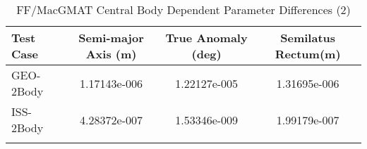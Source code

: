 \begin{table}[htbp!]
\centering
\caption{ FF/MacGMAT Central Body Dependent Parameter Differences (2)}
      \begin{tabular}{lccc}
      \hline\hline
          Test Case & Semi-major Axis (m) & True Anomaly (deg) & Semilatus Rectum(m) \\
         \hline
         GEO-2Body & 1.17143e-006 & 1.22127e-005 & 1.31695e-006 \\
         ISS-2Body & 4.28372e-007 & 1.53346e-009 & 1.99179e-007 \\
      \hline\hline
      \label{Table: FF-MacGMAT CB Parameters Set 2} 
\end{tabular}
\end{table}
